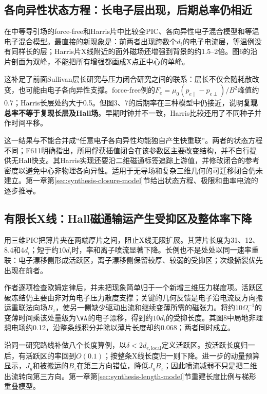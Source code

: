 \subsection{各向异性状态方程：长电子层出现，后期总率仍相近}\label{sec:synthesis-anisotropy}
\citet{F611}在中等导引场的force-free和Harris片中比较全PIC、各向异性电子混合模型和等温电子混合模型。最直接的新现象是：前两者出现跨数个$d_i$的电子电流层，等温例没有同样长的层；Harris片X线附近的面外磁场还增强到背景的约1.5--2倍。图6的沿片剖面为双峰，不能把所有增强都画成X点正中心的单峰。

这补足了前面Sullivan层长研究与压力闭合研究之间的联系：层长不仅会随耗散改变，也可能由电子各向异性支撑。force-free例的$F_e=\mu_0(p_{e\parallel}-p_{e\perp})/B^2$峰值约0.7；Harris长层处约大于0.5。但图3、7的后期率在三种模型中仍接近，说明\textbf{复现总率不等于复现长层及Hall场}。早期时钟并不一致，Harris比较还用了不同种子并作时间平移。

这一结果与\citet{Cassak2015}不能合并成“任意电子各向异性均能独自产生快重联”。两者的状态方程不同；F611明确指出，所用俘获插值闭合在该参数区主要改变结构，并不自行提供无Hall快支。其Harris实现还要沿二维磁通标签追踪上游值，并修改闭合的参考密度以避免中心非物理各向异性。适用于无导场和复杂三维几何的可迁移闭合仍未建立。第一章第\ref{sec:synthesis-closure-model}节给出状态方程、极限和曲率电流的逐步推导。

\subsection{有限长X线：Hall磁通输运产生受抑区及整体率下降}\label{sec:synthesis-finite}
\citet{F659}用三维PIC把薄片夹在两端厚片之间，阻止X线无限扩展。其薄片长度为31、12、8.4和$4d_i$；短于约$10d_i$时，率和离子喷流显著下降。长例也不是处处以同一速率重联：电子漂移侧形成活跃区，离子漂移侧保留较厚、较弱的受抑区；次级撕裂优先出现在前者。

作者逐项检查欧姆定律后，并未把现象简单归于一个新增三维压力梯度项。活跃区破冻结仍主要由非对角电子压力散度支撑；关键的几何反馈是电子沿电流反方向搬运重联法向场$B_z$，使另一侧缺少驱动出流和继续变薄所需的磁张力。将约$10\Omega_i^{-1}$的变薄时间乘该处量级为$\VA$的电子漂移，得到约$10d_i$的受抑长度。其图8中局地非理想电场约0.12，沿整条线积分并除以薄片长度却约0.068；两者同时成立。

\citet{F792}沿同一研究路线补做八个长度算例，以$\delta<2d_{e,\mathrm{local}}$定义活跃区。按活跃长度归一后，有活跃区的率回到$O(0.1)$；按整条X线长度归一则下降。进一步的动量预算显示，$J_y$和被搬运的$B_z$在第三方向错位，降低$J_yB_z$；因此喷流减弱不只是把二维出流转向第三方向。第一章第\ref{sec:synthesis-length-model}节重建长度比例与梯形重叠模型。

